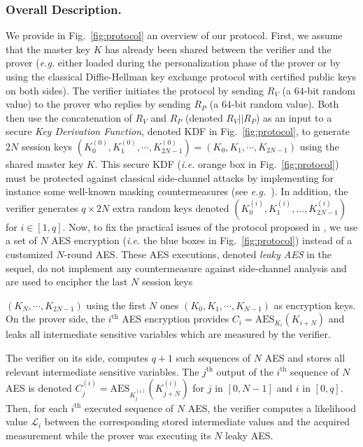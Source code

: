 \subsubsection{Overall Description.}\label{sssec:overall}
We provide in Fig.~\ref{fig:protocol} an overview of our protocol. 
First, we assume that the master key $K$ has already been shared between the verifier and the prover (\emph{e.g.} either loaded during the personalization phase of the prover or by using the classical Diffie-Hellman key exchange protocol with certified public keys on both sides).
The verifier initiates the protocol by sending $R_V$ (a $64$-bit random value) to the prover who replies by sending $R_P$ (a $64$-bit random value). Both then use the concatenation of $R_V$ and $R_P$ (denoted $R_V || R_P$) as an input to a secure \textit{Key Derivation Function}, denoted KDF in Fig.~\ref{fig:protocol}, to generate $2N$ session keys $(K_0^{(0)}, K_1^{(0)}, \cdots, K_{2N-1}^{(0)}) = (K_0, K_1, \cdots, K_{2N-1})$ using the shared master key $K$.
This secure KDF (\emph{i.e.} orange box in Fig.~\ref{fig:protocol}) must be protected against classical side-channel attacks by implementing for instance some well-known masking countermeasures (see \emph{e.g.}~\cite{DBLP:conf/eurocrypt/Coron14,DBLP:conf/ches/GenellePQ11,DBLP:conf/ches/RivainP10}). In addition, the verifier generates $q \times 2N$ extra random keys denoted $(K_0^{(i)}, K_1^{(i)}, \dots, K_{2N-1}^{(i)})$ for $i \in [1,q]$. Now, to fix the practical issues of the protocol proposed in \cite{SakiyamaMMKHMMN15}, we use a set of $N$ AES encryption (\emph{i.e.} the 	blue boxes in Fig.~\ref{fig:protocol}) instead of a customized $N$-round AES. 
These AES executions, denoted \textit{leaky AES} in the sequel, do not implement any countermeasure against side-channel analysis and are used to encipher the last $N$ session keys

$(K_N, \cdots, K_{2N-1})$ using the first $N$ ones $(K_0, K_1, \cdots, K_{N-1})$ as encryption keys.\newline
On the prover side, the $i^{\text{th}}$ AES encryption provides $C_i = \mbox{AES}_{K_i}(K_{i+N})$ and leaks all intermediate sensitive variables which are measured by the verifier.

The verifier on its side, computes $q+1$ such sequences of $N$ AES and stores all relevant intermediate sensitive variables. The $j^\text{th}$ output of the $i^\text{th}$ sequence of $N$ AES is denoted $C_j^{(i)} = \mbox{AES}_{K_j^{(i)}}(K_{j+N}^{(i)})$ for $j$ in $[0,N-1]$ and $i$ in $[0,q]$.
Then, for each $i^\text{th}$ executed sequence of $N$ AES, the verifier computes a likelihood value $\mathcal{L}_i$ between the corresponding stored intermediate values and the acquired measurement while the prover was executing its $N$ leaky AES.

